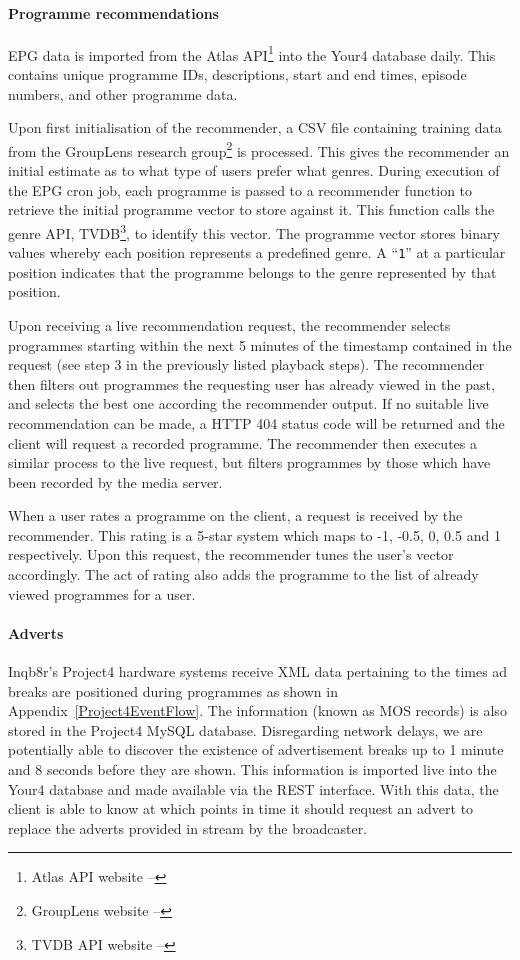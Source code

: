 \paragraph{Programme recommendations}

EPG data is imported from the Atlas API\footnote{Atlas API website -- } into the Your4 database daily. This contains unique programme IDs, descriptions, start and end times, episode numbers, and other programme data.

Upon first initialisation of the recommender, a CSV file containing training data from the GroupLens research group\footnote{GroupLens website -- } is processed. This gives the recommender an initial estimate as to what type of users prefer what genres. During execution of the EPG cron job, each programme is passed to a recommender function to retrieve the initial programme vector to store against it. This function calls the genre API, TVDB\footnote{TVDB API website -- }, to identify this vector. The programme vector stores binary values whereby each position represents a predefined genre. A ``\texttt{1}'' at a particular position indicates that the programme belongs to the genre represented by that position.

Upon receiving a live recommendation request, the recommender selects programmes starting within the next 5 minutes of the timestamp contained in the request (see step 3 in the previously listed playback steps). The recommender then filters out programmes the requesting user has already viewed in the past, and selects the best one according the recommender output. If no suitable live recommendation can be made, a HTTP 404 status code will be returned and the client will request a recorded programme. The recommender then executes a similar process to the live request, but filters programmes by those which have been recorded by the media server.

When a user rates a programme on the client, a request is received by the recommender. This rating is a 5-star system which maps to -1, -0.5, 0, 0.5 and 1 respectively. Upon this request, the recommender tunes the user's vector accordingly. The act of rating also adds the programme to the list of already viewed programmes for a user.

\paragraph{Adverts}
\label{sec:lamp-adverts}
Inqb8r's Project4 hardware systems receive XML data pertaining to the times ad breaks are positioned during programmes as shown in Appendix~\ref{Project4EventFlow}. The information (known as MOS records) is also stored in the Project4 MySQL database. Disregarding network delays, we are potentially able to discover the existence of advertisement breaks up to 1 minute and 8 seconds before they are shown. This information is imported live into the Your4 database and made available via the REST interface. With this data, the client is able to know at which points in time it should request an advert to replace the adverts provided in stream by the broadcaster.

